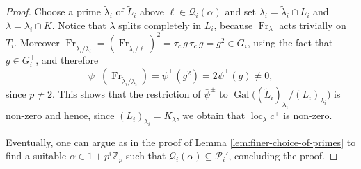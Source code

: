 \documentclass[12pt,reqno]{amsart}
\theoremstyle{definition}
\theoremstyle{remark}
\newcommand{\numberset}{\mathbb}
\newcommand{\Z}{\numberset{Z}}
\DeclareMathOperator{\Gal}{Gal}
\DeclareMathOperator{\Frac}{Frac}
\DeclareMathOperator{\loc}{loc}
\DeclareMathOperator{\Fr}{Fr}
\newcommand{\ga}{\alpha}
\newcommand{\gl}{\lambda}
\begin{document}
\begin{proof}
   Choose a prime $\tilde{\gl}_i$ of $\tilde{L}_i$ above $\ell\in \mathcal{Q}_i(\ga)$ and set $\gl_i=\tilde{\gl}_i\cap L_i$ and $\gl=\gl_i\cap K$. Notice that $\gl$ splits completely in $L_i$, because $\Fr_{\lambda}$ acts trivially on $T_i$. Moreover $\Fr_{\tilde{\gl}_i/\gl_i}=(\Fr_{\tilde{\gl}_i/\ell})^2=\tau_c \, g\,\tau_c\, g=g^2\in G_i$, using the fact that $g\in G_i^+$, and therefore
    \begin{equation*}
        \bar{\psi}^{\pm}(\Fr_{\tilde{\gl}_i/\gl_i})
        =\bar{\psi}^{\pm}(g^2)=2\bar{\psi}^{\pm}(g)\ne 0,
    \end{equation*}
    since $p\ne 2$. This shows that the restriction of $\bar{\psi}^{\pm}$ to $\Gal\big((\tilde{L}_i)_{\tilde{\gl}_i}/(L_i)_{\gl_i}\big)$ is non-zero and hence, since $(L_i)_{\gl_i}=K_\gl$, we obtain that $\loc_\gl c^{\pm}$ is non-zero.

   Eventually, one can argue as in the proof of Lemma \ref{lem:finer-choice-of-primes} to find a suitable $\ga\in 1+p^i\Z_p$ such that $\mathcal{Q}_i(\ga)\subseteq \mathcal{P}_i'$, concluding the proof.
\end{proof}












\printbibliography
 
 
\end{document}
